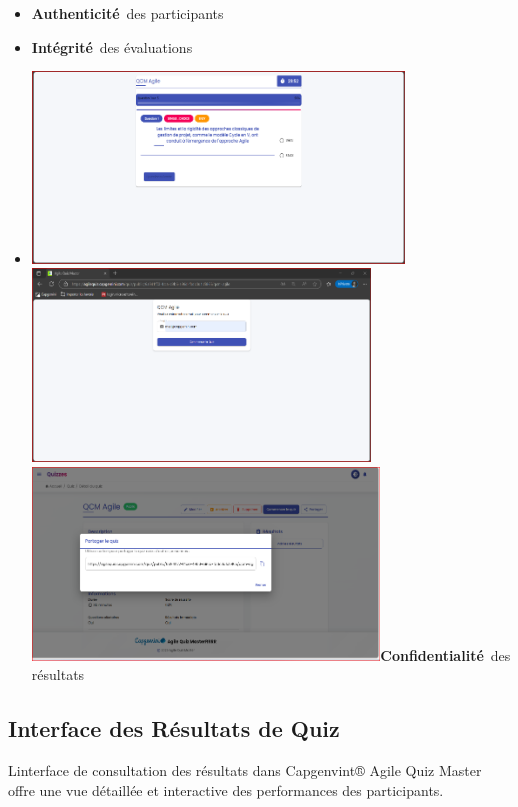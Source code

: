 \documentclass[12pt,a4paper,twoside]{report}
\begin{document}
\begin{itemize}
\item
  \textbf{Authenticité}~des participants
\item
  \textbf{Intégrité}~des évaluations
\item
  \includegraphics[width=3.88264in,height=2.00556in]{latex_media/media/image61.png}\includegraphics[width=3.53125in,height=2.01806in]{latex_media/media/image62.png}\includegraphics[width=3.62986in,height=2.02292in]{latex_media/media/image63.png}\textbf{Confidentialité}~des
  résultats
\end{itemize}

\hypertarget{interface-des-ruxe9sultats-de-quiz}{%
\subsection{Interface des Résultats de
Quiz}\label{interface-des-ruxe9sultats-de-quiz}}

L\textquotesingle interface de consultation des résultats dans
Capgenvint® Agile Quiz Master offre une vue détaillée et interactive des
performances des participants.
\end{document}
